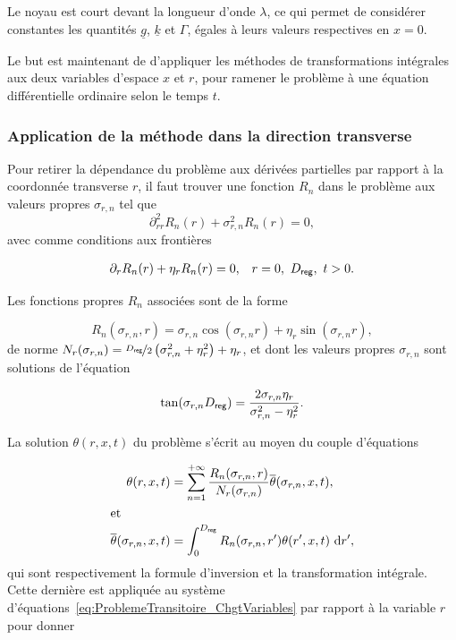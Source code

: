Le noyau est court devant la longueur d'onde $\lambda$, ce qui permet de considérer constantes les quantités $\underline g$, $\underline k$ et $\Gamma$, égales à leurs valeurs respectives en $x=0$.\medskip

Le but est maintenant de d'appliquer les méthodes de transformations intégrales aux deux variables d'espace $x$ et $r$, pour ramener le problème à une équation différentielle ordinaire selon le temps $t$.

\subsubsection{Application de la méthode dans la direction transverse}
Pour retirer la dépendance du problème aux dérivées partielles par rapport à la coordonnée transverse $r$, il faut trouver une fonction $R_n$ dans le problème aux valeurs propres $\sigma_{r,n}$ tel que
\begin{equation}
	\partial_{rr}^2 R_n(r) + \sigma_{r,n}^2 R_n(r) = 0,
	\label{eq:TransfoInteg_ProbValPropre_R}
\end{equation}
avec comme conditions aux frontières

\begin{align}
	\partial_r R_n(r) + \eta_r R_n(r) &= 0, & r=0,\ D_{\sf reg},\  t>0. \label{eq:TransfoInteg_CondFront_R}
\end{align}

Les fonctions propres $R_n$ associées sont de la forme

\begin{equation}
	R_n(\sigma_{r,n},r) = \sigma_{r,n} \cos(\sigma_{r,n} r) + \eta_r \sin(\sigma_{r,n} r),
	\label{eq:TransfoInteg_FonctionPropres_R}
\end{equation}
de norme $N_r(\sigma_{r,n})=\nicefrac{D_{\sf reg}}{2}\left( \sigma_{r,n}^2+\eta_r^2 \right)+\eta_r$, et dont les valeurs propres $\sigma_{r,n}$ sont solutions de l'équation

\begin{equation}
	\tan(\sigma_{r,n} D_{\sf reg}) = \frac{2\sigma_{r,n} \eta_r}{\sigma_{r,n}^2 - \eta_r^2}. 
\end{equation}

La solution $\theta(r,x,t)$ du problème s'écrit au moyen du couple d'équations

\begin{subequations}
	\begin{align}
		\theta(r,x,t) &= \sum_{n=1}^{+\infty}\frac{R_n(\sigma_{r,n}, r)}{N_r(\sigma_{r,n})} \overline \theta(\sigma_{r,n},x,t), \label{eq:TransfoInteg_Inversion_R} \\ \intertext{et}
		\overline \theta(\sigma_{r,n},x,t) &= \int_{0}^{D_{\sf reg}} R_n(\sigma_{r,n},r')\theta(r',x,t)\ \mathrm{d} r', \label{eq:TransfoInter_TransfoInteg_R}
	\end{align}
\end{subequations}
qui sont respectivement la formule d'inversion et la transformation intégrale. Cette dernière est appliquée au système d'équations~\ref{eq:ProblemeTransitoire_ChgtVariables} par rapport à la variable $r$ pour donner


